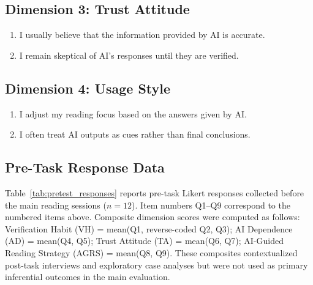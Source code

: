 \documentclass[manuscript,review,anonymous]{acmart}
\begin{document}
\subsection*{Dimension 3: Trust Attitude}
\begin{enumerate}[label=\arabic*.]
 \item I usually believe that the information provided by AI is accurate.
 \item I remain skeptical of AI’s responses until they are verified. 
\end{enumerate}

\subsection*{Dimension 4: Usage Style}
\begin{enumerate}[label=\arabic*.]
 \item I adjust my reading focus based on the answers given by AI. 
 \item I often treat AI outputs as cues rather than final conclusions. 
\end{enumerate}

\subsection{Pre-Task Response Data}
\label{appendix:pretest-responses}

Table~\ref{tab:pretest_responses} reports pre-task Likert responses collected before the main reading sessions ($n=12$). Item numbers Q1--Q9 correspond to the numbered items above. Composite dimension scores were computed as follows: Verification Habit (VH) = mean(Q1, reverse-coded Q2, Q3); AI Dependence (AD) = mean(Q4, Q5); Trust Attitude (TA) = mean(Q6, Q7); AI-Guided Reading Strategy (AGRS) = mean(Q8, Q9). These composites contextualized post-task interviews and exploratory case analyses but were not used as primary inferential outcomes in the main evaluation.
\end{document}
